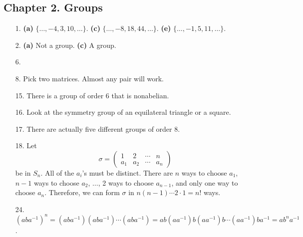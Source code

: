  
 
\subsection*{Chapter 2. Groups}
 
 
{\small
\begin{itemize}
 
\bf\item[1.]\rm
{\bf (a)} $\{ \ldots, -4, 3, 10, \ldots \}$.
{\bf (c)} $\{ \ldots, -8, 18, 44, \ldots \}$.
{\bf (e)} $\{ \ldots, -1, 5, 11, \ldots \}$.
 
\bf\item[2.]\rm
{\bf (a)} Not a group.
{\bf (c)} A group.
 
 
 
\bf\item[6.]\rm
{}
 
 
\bf\item[8.]\rm
Pick two matrices. Almost any pair will work.
 
\bf\item[15.]\rm
There is a group of order 6 that is nonabelian.
 
\bf\item[16.]\rm
Look at the symmetry group of an equilateral triangle or a square.
 
\bf\item[17.]\rm
There are actually five different groups of order 8.
 
\bf\item[18.]\rm
Let
\[
\sigma
=
\left(
\begin{array}{ccccc}
1   & 2   & \cdots & n \\
a_1 & a_2 & \cdots & a_n
\end{array}
\right)
\]
be in $S_n$. All of the $a_i$'s must be distinct.  There are $n$ ways
to choose $a_1$, $n-1$ ways to choose $a_2$, $\ldots$, 2 ways to
choose $a_{n-1}$, and only one way to choose $a_n$. Therefore, we can form
$\sigma$ in $n(n-1) \cdots 2 \cdot 1 = n!$ ways.
 
\bf\item[24.]\rm
$(aba^{-1})^n = (aba^{-1})(aba^{-1}) \cdots (aba^{-1}) 
= ab(aa^{-1})b(aa^{-1})b \cdots (aa^{-1})ba^{-1} = ab^na^{-1}$.
 

\end{itemize}}
